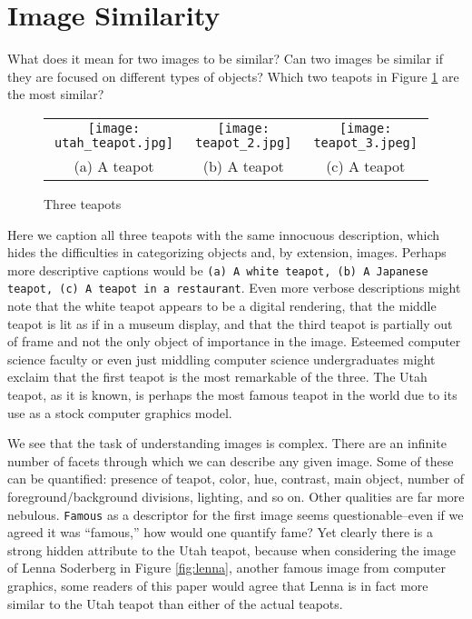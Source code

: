 
\section{Image Similarity}
What does it mean for two images to be similar? Can two images be similar if they are focused on different types of objects? Which two teapots in Figure \ref{fig:teapots} are the most similar?

\begin{figure}[!htbp]
	\centering
	\begin{tabular}{ccc}
		\texttt{[image: utah\_teapot.jpg]} &  
		\texttt{[image: teapot\_2.jpg]} & \texttt{[image: teapot\_3.jpeg]} \\
		(a) A teapot & (b) A teapot & (c) A teapot\\[6pt]
	\end{tabular}
	\label{fig:teapots}
	\caption{Three teapots}
\end{figure}

Here we caption all three teapots with the same innocuous description, which hides the difficulties in categorizing objects and, by extension, images. Perhaps more descriptive captions would be \texttt{(a) A white teapot, (b) A Japanese teapot, (c) A teapot in a restaurant}. Even more verbose descriptions might note that the white teapot appears to be a digital rendering, that the middle teapot is lit as if in a museum display, and that the third teapot is partially out of frame and not the only object of importance in the image. Esteemed computer science faculty or even just middling computer science undergraduates might exclaim that the first teapot is the most remarkable of the three. The Utah teapot, as it is known, is perhaps the most famous teapot in the world due to its use as a stock computer graphics model.

We see that the task of understanding images is complex. There are an infinite number of facets through which we can describe any given image. Some of these can be quantified: presence of teapot, color, hue, contrast, main object, number of foreground/background divisions, lighting, and so on. Other qualities are far more nebulous. \texttt{Famous} as a descriptor for the first image seems questionable--even if we agreed it was ``famous,'' how would one quantify fame? Yet clearly there is a strong hidden attribute to the Utah teapot, because when considering the image of Lenna Soderberg in Figure \ref{fig:lenna}, another famous image from computer graphics, some readers of this paper would agree that Lenna is in fact more similar to the Utah teapot than either of the actual teapots.

